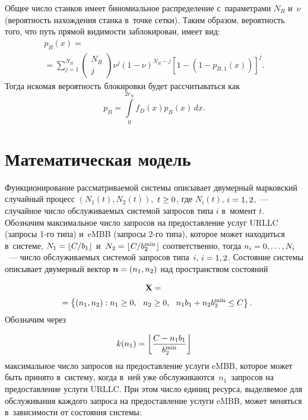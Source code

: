 \begin{multicols}{2}
Общее число станков имеет биномиальное распределение с~параметрами $N_R$ и~$\nu$ 
(вероятность нахождения станка в~точке сетки). Таким образом, вероятность того, 
что путь прямой видимости заблокирован, имеет вид:
\begin{multline*}
p_{B}(x)={}\\
\!{}=\sum\limits_{j=1}^{N_R}\!\begin{pmatrix}
N_R\\ j\end{pmatrix} 
\nu^{j}(1-\nu)^{N_R-j}
\left[1-(1-p_{B,1}(x))\right]^j\!. \!
\end{multline*}
%
Тогда искомая вероятность блокировки будет рассчитываться как
\begin{equation*}
p_{B}=\int\limits_{0}^{2r_N}f_{D}(x)p_{B}(x)\,dx.
\end{equation*}

\section{Математическая модель}

Функционирование рассматриваемой сис\-те\-мы описывает двумерный марковский 
случайный процесс $(N_1(t), N_2(t))$,\ $t \hm\geq 0$, где $N_i(t)$, $i \hm= 1,2$,~---
случайное чис\-ло об\-слу\-жи\-ва\-емых сис\-те\-мой запросов типа $i$ в~момент $t$. Обозначим 
максимальное чис\-ло запросов на предоставление услуг URLLC (за\-про\-сы 1-го типа) 
и~eMBB (запросы 2-го типа), которое может находиться в~сис\-те\-ме, $N_1 \hm= \lfloor 
C/b_1 \rfloor$ и~$N_2\hm = \lfloor C/b_2^{\min} \rfloor$ соответственно, тогда $n_i \hm= 0,\ldots,N_i$~--- чис\-ло 
об\-слу\-жи\-ва\-емых сис\-те\-мой за\-про\-сов типа~$i$, $i\hm = 1,2$.
Состояние сис\-те\-мы описывает двумерный век\-тор $\mathbf{n}\hm=(n_1,n_2)$ над 
пространством со\-сто\-яний


\vspace*{-6pt}

\noindent
\begin{multline*}
\mathbf{X} = {}\\[2pt]
\!{}=\left\{ (n_1,n_2): n_1 \geq 0,\ \  n_2 \geq 0,\ \ n_1 b_1 + n_2 b_2^{\min} \leq 
C \right\}.\hspace*{-5.19798pt}
\end{multline*}
Обозначим через 

\noindent
$$
k(n_1) = \left\lfloor \displaystyle\frac{\displaystyle C-n_1 b_1\mathstrut}{\displaystyle b_2^{\min}\mathstrut}\right \rfloor
$$ 
максимальное чис\-ло 
запросов на предостав\-ле\-ние услуги \mbox{eMBB}, которое может быть принято в~сис\-те\-му, 
когда в~ней уже обслуживаются~$n_1$~запросов на предостав\-ле\-ние услуги URLLC. При 
этом чис\-ло единиц ресурса, выделяемое для обслуживания каждого запроса на 
предостав\-ле\-ние услуги eMBB, может меняться в~за\-ви\-си\-мости от со\-сто\-яния сис\-темы: 


\end{multicols}
